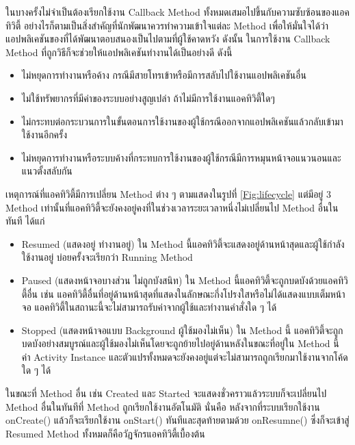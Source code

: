 	ในบางครั้งไม่จำเป็นต้องเรียกใช้งาน Callback Method ทั้งหมดเสมอไปขึ้นกับความซับซ้อนของแอคทิวิตี้ อย่างไรก็ตามเป็นสิ่งสำคัญที่นักพัฒนาควรทำความเข้าใจแต่ละ Method เพื่อให้มั่นใจได้ว่าแอปพลิเคชันของที่ได้พัฒนาตอบสนองเป็นไปตามที่ผู้ใช้คาดหวัง ดังนั้น ในการใช้งาน Callback Method
	ที่ถูกวิธีก็จะช่วยให้แอปพลิเคชันทำงานได้เป็นอย่างดี ดังนี้
	\begin{itemize}
		\item ไม่หยุดการทำงานหรือค้าง กรณีมีสายโทรเข้าหรือมีการสลับไปใช้งานแอปพลิเคชันอื่น 
		\item ไม่ใช้ทรัพยากรที่มีค่าของระบบอย่างสูญเปล่า ถ้าไม่มีการใช้งานแอคทิวิตี้ใดๆ 
		\item ไม่กระทบต่อกระบวนการในขั้นตอนการใช้งานของผู้ใช้กรณีออกจากแอปพลิเคชันแล้วกลับเข้ามาใช้งานอีกครั้ง 
		\item ไม่หยุดการทำงานหรือระบบค้างที่กระทบการใช้งานของผู้ใช้กรณีมีการหมุนหน้าจอแนวนอนและแนวตั้งสลับกัน
	\end{itemize}
	
	เหตุการณ์ที่แอคทิวิตี้มีการเปลี่ยน Method ต่าง ๆ ตามแสดงในรูปที่  \ref{Fig:lifecycle}
	แต่มีอยู่ 3 Method เท่านั้นที่แอคทิวิตี้จะยังคงอยู่คงที่ในช่วงเวลาระยะเวลาหนึ่งไม่เปลี่ยนไป Method อื่นในทันที ได้แก่
		\begin{itemize}
		\item Resumed (แสดงอยู่ ทำงานอยู่) ใน Method นี้แอคทิวิตี้จะแสดงอยู่ด้านหน้าสุดและผู้ใช้กำลังใช้งานอยู่ บ่อยครั้งจะเรียกว่า Running Method
		\item Paused (แสดงหน้าจอบางส่วน ไม่ถูกบังสนิท) ใน Method นี้แอคทิวิตี้จะถูกบดบังด้วยแอคทิวิตี้อื่น เช่น แอคทิวิตี้อื่นที่อยู่ด้านหน้าสุดที่แสดงในลักษณะกึ่งโปรงใสหรือไม่ได้แสดงแบบเต็มหน้าจอ  แอคทิวิตี้ในสถานะนี้จะไม่สามารถรับค่าจากผู้ใช้และทำงานคำสั่งใด ๆ ได้
		\item Stopped (แสดงหน้าจอแบบ Background ผู้ใช้มองไม่เห็น) ใน Method นี้ แอคทิวิตี้จะถูกบดบังอย่างสมบูรณ์และผู้ใช้มองไม่เห็นโดยจะถูกย้ายไปอยู่ด้านหลังในขณะที่อยู่ใน Method นี้
		ค่า Activity Instance และตัวแปรทั้งหมดจะยังคงอยู่แต่จะไม่สามารถถูกเรียกมาใช้งานจากโค้ดใด ๆ ได้
		\end{itemize}

		ในขณะที่ Method อื่น เช่น Created และ Started จะแสดงชั่วคราวแล้วระบบก็จะเปลี่ยนไป Method อื่นในทันทีที่ Method ถูกเรียกใช้งานอัตโนมัติ นั่นคือ หลังจากที่ระบบเรียกใช้งาน onCreate() แล้วก็จะเรียกใช้งาน onStart() ทันทีและสุดท้ายตามด้วย onResumne()  ซึ่งก็จะเข้าสู่ Resumed Method ทั้งหมดก็คือวัฏจักรแอคทิวิตี้เบื้องต้น

	

